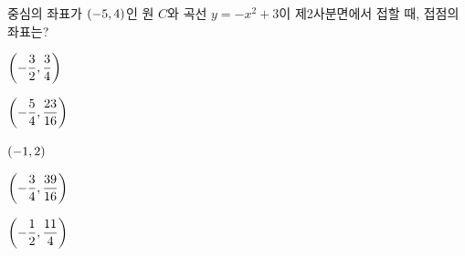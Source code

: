 중심의 좌표가 $(-5{,}\mkern3mu\mathopen{}4)$인 원 $C$와 곡선 $y=-x^2+3$이 제2사분면에서 접할 때, 접점의 좌표는?
\begin{choices32}{\rule[-3ex]{0pt}{8ex}$\left(-\dfrac{3}{2}{,}\mkern3mu\mathopen{}\dfrac{3}{4}\right)$}{\rule[-3ex]{0pt}{8ex}$\left(-\dfrac{5}{4}{,}\mkern3mu\mathopen{}\dfrac{23}{16}\right)$}{\rule[-3ex]{0pt}{8ex}$(-1{,}\mkern3mu\mathopen{}2)$}{\rule[-3ex]{0pt}{8ex}$\left(-\dfrac{3}{4}{,}\mkern3mu\mathopen{}\dfrac{39}{16}\right)$}{\rule[-3ex]{0pt}{8ex}$\left(-\dfrac{1}{2}{,}\mkern3mu\mathopen{}\dfrac{11}{4}\right)$}\end{choices32}
